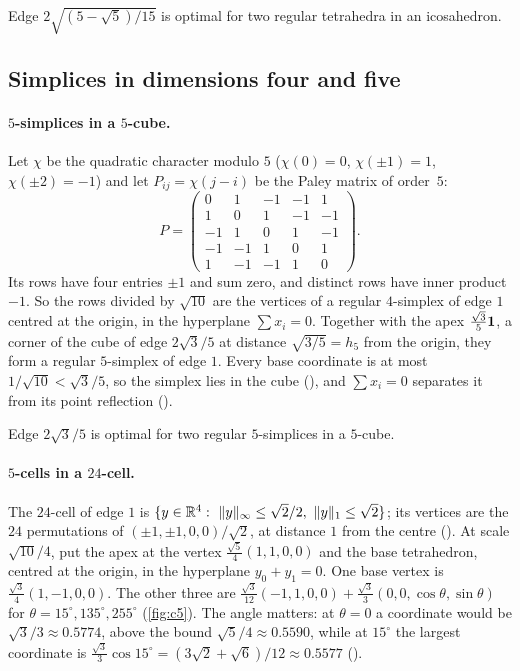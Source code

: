 \documentclass[11pt,a4paper]{article}
\begin{document}
\begin{theorem}
Edge $2\sqrt{(5-\sqrt5)/15}$ is optimal for two regular tetrahedra in an icosahedron.
\end{theorem}

\subsection{Simplices in dimensions four and five}\label{sec:simplices}

\paragraph{$5$-simplices in a $5$-cube.} Let $\chi$ be the quadratic character modulo $5$ ($\chi(0)=0$, $\chi(\pm1)=1$, $\chi(\pm2)=-1$) and let $P_{ij}=\chi(j-i)$ be the Paley matrix of order~$5$:
\[
P=\begin{pmatrix}
0&1&-1&-1&1\\ 1&0&1&-1&-1\\ -1&1&0&1&-1\\ -1&-1&1&0&1\\ 1&-1&-1&1&0
\end{pmatrix}.
\]
Its rows have four entries $\pm1$ and sum zero, and distinct rows have inner product $-1$. So the rows divided by $\sqrt{10}$ are the vertices of a regular $4$-simplex of edge $1$ centred at the origin, in the hyperplane $\sum x_i=0$. Together with the apex $\tfrac{\sqrt3}{5}\mathbf 1$, a corner of the cube of edge $2\sqrt3/5$ at distance $\sqrt{3/5}=h_5$ from the origin, they form a regular $5$-simplex of edge $1$. Every base coordinate is at most $1/\sqrt{10}<\sqrt3/5$, so the simplex lies in the cube (), and $\sum x_i=0$ separates it from its point reflection ().

\begin{theorem}
Edge $2\sqrt3/5$ is optimal for two regular $5$-simplices in a $5$-cube.
\end{theorem}

\paragraph{$5$-cells in a $24$-cell.} The $24$-cell of edge $1$ is $\{y\in\R^4:\ \norm{y}_\infty\le\sqrt2/2,\ \norm{y}_1\le\sqrt2\}$; its vertices are the $24$ permutations of $(\pm1,\pm1,0,0)/\sqrt2$, at distance $1$ from the centre (). At scale $\sqrt{10}/4$, put the apex at the vertex $\tfrac{\sqrt5}{4}(1,1,0,0)$ and the base tetrahedron, centred at the origin, in the hyperplane $y_0+y_1=0$. One base vertex is $\tfrac{\sqrt3}{4}(1,-1,0,0)$. The other three are $\tfrac{\sqrt3}{12}(-1,1,0,0)+\tfrac{\sqrt3}{3}(0,0,\cos\theta,\sin\theta)$ for $\theta=15^\circ,135^\circ,255^\circ$ (\cref{fig:c5}). The angle matters: at $\theta=0$ a coordinate would be $\sqrt3/3\approx0.5774$, above the bound $\sqrt5/4\approx0.5590$, while at $15^\circ$ the largest coordinate is $\tfrac{\sqrt3}{3}\cos15^\circ=(3\sqrt2+\sqrt6)/12\approx0.5577$ ().
\end{document}

